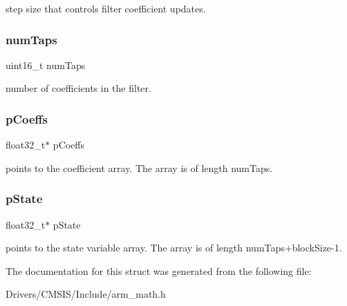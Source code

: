 step size that controls filter coefficient updates. \mbox{\label{structarm__lms__instance__f32_a751941891e47f522a7f5375fe8990aac}} 
\subsubsection{\texorpdfstring{num\+Taps}{numTaps}}
{\footnotesize\ttfamily uint16\+\_\+t num\+Taps}

number of coefficients in the filter. \mbox{\label{structarm__lms__instance__f32_aacbb8dd8eeba4b21fc2bb40076405ee3}} 
\subsubsection{\texorpdfstring{p\+Coeffs}{pCoeffs}}
{\footnotesize\ttfamily float32\+\_\+t$\ast$ p\+Coeffs}

points to the coefficient array. The array is of length num\+Taps. \mbox{\label{structarm__lms__instance__f32_a335c87e6fdc4b96601d95a5de8b9c463}} 
\subsubsection{\texorpdfstring{p\+State}{pState}}
{\footnotesize\ttfamily float32\+\_\+t$\ast$ p\+State}

points to the state variable array. The array is of length num\+Taps+block\+Size-\/1. 

The documentation for this struct was generated from the following file\+:\begin{DoxyCompactItemize}
\item 
Drivers/\+C\+M\+S\+I\+S/\+Include/arm\+\_\+math.\+h\end{DoxyCompactItemize}
